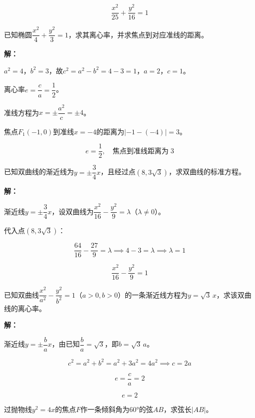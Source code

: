 \documentclass[12pt, a4paper]{ctexart}
\begin{document}
$$\boxed{\dfrac{x^2}{25} + \dfrac{y^2}{16} = 1}$$

\begin{examplebox}[【例题2】椭圆离心率问题]
已知椭圆$\dfrac{x^2}{4} + \dfrac{y^2}{3} = 1$，求其离心率，并求焦点到对应准线的距离。
\end{examplebox}

\textbf{解：}

$a^2 = 4$，$b^2 = 3$，故$c^2 = a^2 - b^2 = 4 - 3 = 1$，$a = 2$，$c = 1$。

离心率$e = \dfrac{c}{a} = \dfrac{1}{2}$。

准线方程为$x = \pm\dfrac{a^2}{c} = \pm 4$。

焦点$F_1(-1, 0)$到准线$x = -4$的距离为$|-1 - (-4)| = 3$。

$$\boxed{e = \frac{1}{2}, \quad \text{焦点到准线距离为}\; 3}$$

\begin{examplebox}[【例题3】求双曲线标准方程]
已知双曲线的渐近线为$y = \pm \dfrac{3}{4}x$，且经过点$(8, 3\sqrt{3})$，求双曲线的标准方程。
\end{examplebox}

\textbf{解：}

渐近线$y = \pm\dfrac{3}{4}x$，设双曲线为$\dfrac{x^2}{16} - \dfrac{y^2}{9} = \lambda$（$\lambda \neq 0$）。

代入点$(8, 3\sqrt{3})$：

$$\frac{64}{16} - \frac{27}{9} = \lambda \implies 4 - 3 = \lambda \implies \lambda = 1$$

$$\boxed{\dfrac{x^2}{16} - \dfrac{y^2}{9} = 1}$$

\begin{examplebox}[【例题4】双曲线的离心率与渐近线]
已知双曲线$\dfrac{x^2}{a^2} - \dfrac{y^2}{b^2} = 1$（$a > 0, b > 0$）的一条渐近线方程为$y = \sqrt{3}\,x$，求该双曲线的离心率。
\end{examplebox}

\textbf{解：}

渐近线$y = \pm\dfrac{b}{a}x$，由已知$\dfrac{b}{a} = \sqrt{3}$，即$b = \sqrt{3}\,a$。

$$c^2 = a^2 + b^2 = a^2 + 3a^2 = 4a^2 \implies c = 2a$$

$$e = \frac{c}{a} = 2$$

$$\boxed{e = 2}$$

\begin{examplebox}[【例题5】抛物线焦点弦问题]
过抛物线$y^2 = 4x$的焦点$F$作一条倾斜角为$60°$的弦$AB$，求弦长$|AB|$。
\end{examplebox}
\end{document}
